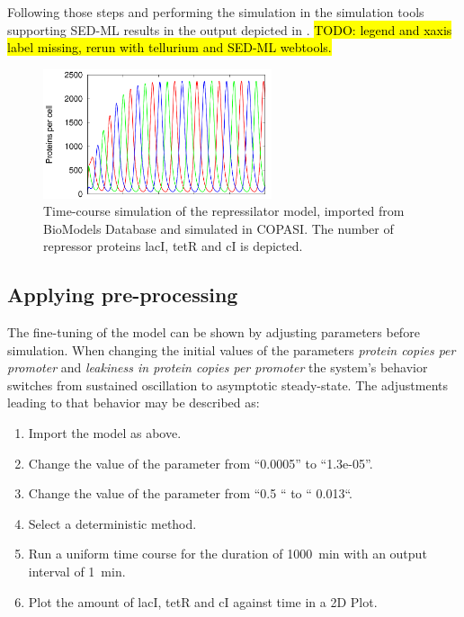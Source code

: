 Following those steps and performing the simulation in the simulation tools supporting SED-ML results in the output depicted in . \hl{TODO: legend and xaxis label missing, rerun with tellurium and SED-ML webtools.}

\begin{figure}[H]
\centering
\includegraphics[width=0.6\textwidth]{examples/rep_tc.png}
\caption{Time-course simulation of the repressilator model, imported from BioModels Database and simulated in COPASI. The number of repressor proteins lacI, tetR and cI is depicted.}
\label{fig:rep_tc}
\end{figure}


\subsection{Applying pre-processing}
\label{sec:preprocessing}
The fine-tuning of the model can be shown by adjusting parameters before simulation. When changing the initial values of the parameters \emph{protein copies per promoter} and \emph{leakiness in protein copies per promoter} the system's behavior switches from sustained oscillation to asymptotic steady-state. The adjustments leading to that behavior may be described as: 

\begin{enumerate}
\item{Import the model as above.}
\item{Change the value of the parameter  from “0.0005” to “1.3e-05”.}
\item{Change the value of the parameter  from “0.5 “ to “ 0.013“.}
\item{Select a deterministic method.}
\item{Run a uniform time course for the duration of 1000~min with an output interval of 1~min.}
\item Plot the amount of lacI, tetR and cI against time in a 2D Plot.
\end{enumerate}


